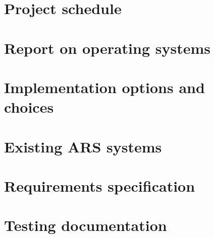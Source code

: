 \documentclass[a4papert,11pt,notitlepage]{ltxdoc}
\begin{document}
\begin{appendices}
\appendixpage
\addappheadtotoc
\section{Project schedule}
\label{app:schedule}

\section{Report on operating systems}
\label{app:osreport}

\section{Implementation options and choices}
\label{app:implementationoptions}

\section{Existing ARS systems}
\label{app:existingars}

\section{Requirements specification}
\label{app:requirements}

\section{Testing documentation}
\label{app:testing}
\end{appendices}
\end{document}
